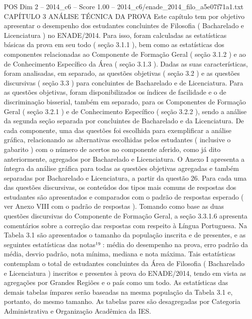 \begin{textsample}{POS Dim 2 – 2014\_c6 – Score 1.00 – 2014\_c6/enade\_2014\_filo\_a5e07f71a1.txt}  \label{ex:f2_pos_229}
CAPÍTULO 3 ANÁLISE TÉCNICA DA PROVA Este capítulo tem por objetivo apresentar o desempenho dos estudantes concluintes de Filosofia ( Bacharelado e Licenciatura ) no ENADE/2014.
Para isso, foram calculadas as estatísticas básicas da prova em seu todo ( seção 3.1.1 ), bem como as estatísticas dos componentes relacionadas ao Componente de Formação Geral ( seção 3.1.2 ) e ao de Conhecimento Específico da Área ( seção 3.1.3 ).
Dadas as suas características, foram analisadas, em separado, as questões objetivas ( seção 3.2 ) e as questões discursivas ( seção 3.3 ) para concluintes de Bacharelado e de Licenciatura.
Para as questões objetivas, foram disponibilizados os índices de facilidade e o de discriminação bisserial, também em separado, para os Componentes de Formação Geral ( seção 3.2.1 ) e de Conhecimento Específico ( seção 3.2.2 ), sendo a análise da segunda seção separada por concluintes de Bacharelado e da Licenciatura.
De cada componente, uma das questões foi escolhida para exemplificar a análise gráfica, relacionando as alternativas escolhidas pelos estudantes ( inclusive o gabarito ) com o número de acertos no componente aferido, como já dito anteriormente, agregados por Bacharelado e Licenciatura.
O Anexo I apresenta a íntegra da análise gráfica para todas as questões objetivas agregadas e também separadas por Bacharelado e Licenciatura, a partir da questão 26.
Para cada uma das questões discursivas, os conteúdos dos tipos mais comuns de respostas dos estudantes são apresentados e comparados com o padrão de respostas esperado ( ver Anexo VIII com o padrão de respostas ).
Tomando como base as duas questões discursivas do Componente de Formação Geral, a seção 3.3.1.6 apresenta comentários sobre a correção das respostas com respeito à Língua Portuguesa.
Na Tabela 3.1 são apresentados o tamanho da população inscrita e de presentes, e as seguintes estatísticas das notas¹⁹ : média do desempenho na prova, erro padrão da média, desvio padrão, nota mínima, mediana e nota máxima.
Tais estatísticas contemplam o total de estudantes concluintes da Área de Filosofia ( Bacharelado e Licenciatura ) inscritos e presentes à prova do ENADE/2014, tendo em vista as agregações por Grandes Regiões e o país como um todo.
As estatísticas das demais tabelas ímpares serão baseadas na mesma população da Tabela 3.1 e, portanto, do mesmo tamanho.
As tabelas pares são desagregadas por Categoria Administrativa e Organização Acadêmica da IES.

\end{textsample}
